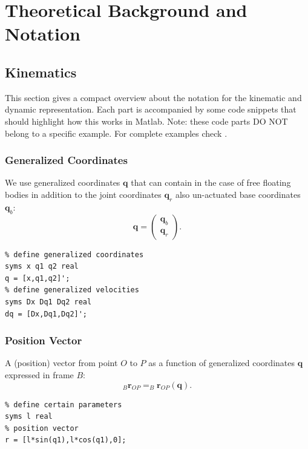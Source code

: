 \chapter{Theoretical Background and Notation}\label{sec:theory}

\section{Kinematics}\label{sec:kinematics}
This section gives a compact overview about the notation for the kinematic and dynamic representation.  Each part is accompanied by some code snippets that should highlight how this works in Matlab.  Note: these code parts DO NOT belong to a specific example.  For complete examples check .

\subsection{Generalized Coordinates}
We use generalized coordinates $\mathbf{q}$ that can contain in the case of free floating bodies in addition to the joint coordinates $\mathbf{q}_{r}$ also un-actuated base coordinates $\mathbf{q}_b$: 
\begin{equation}
\mathbf{q} = \left( \begin{array}{c} \mathbf{q}_{b} \\ \mathbf{q}_{r} \end{array}\right).
\end{equation}

\begin{lstlisting}
% define generalized coordinates 
syms x q1 q2 real
q = [x,q1,q2]';
% define generalized velocities
syms Dx Dq1 Dq2 real
dq = [Dx,Dq1,Dq2]';
\end{lstlisting}

\subsection{Position Vector}
A (position) vector from point $O$ to $P$ as a function of generalized coordinates $\mathbf{q}$ expressed in frame $B$:
\begin{equation}
_B \mathbf{r}_{OP} = _B \mathbf{r}_{OP}\left(\mathbf{q}\right).
\end{equation}
\begin{lstlisting}
% define certain parameters
syms l real
% position vector
r = [l*sin(q1),l*cos(q1),0];
\end{lstlisting}


